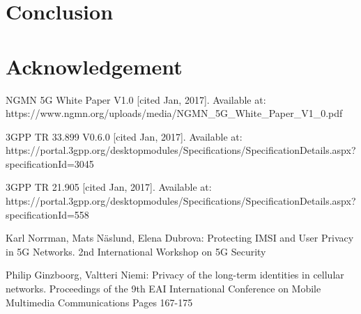 \documentclass[lnicst,sechang,a4paper]{svmultln}
\begin{document}


\section{Conclusion}
\label{sec:conclusion}

\section{Acknowledgement}
\label{sec:acknowledgement}



\begin{thebibliography}{4}

 NGMN 5G White Paper V1.0 [cited Jan, 2017]. Available at: https://www.ngmn.org/uploads/media/NGMN\_5G\_White\_Paper\_V1\_0.pdf

 3GPP TR 33.899 V0.6.0 [cited Jan, 2017]. Available at: https://portal.3gpp.org/desktopmodules/Specifications/SpecificationDetails.aspx?\\specificationId=3045

 3GPP TR 21.905 [cited Jan, 2017]. Available at: https://portal.3gpp.org/desktopmodules/Specifications/SpecificationDetails.aspx?\\specificationId=558


 Karl Norrman, Mats Näslund, Elena Dubrova: Protecting IMSI and User Privacy in 5G Networks. 2nd International Workshop on 5G Security

 Philip Ginzboorg,  Valtteri Niemi: Privacy of the long-term identities in cellular networks. Proceedings of the 9th EAI International Conference on Mobile Multimedia Communications
Pages 167-175




\end{thebibliography}
\end{document}
